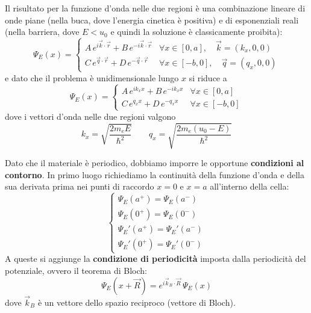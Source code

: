 \begin{example}
Il risultato per la funzione d'onda nelle due regioni è una combinazione lineare di onde piane (nella buca, dove l'energia cinetica è positiva) e di esponenziali reali (nella barriera, dove \( E < u_0 \) e quindi la soluzione è classicamente proibita):
\begin{equation}
    \Psi_E(x) = \begin{cases}
        A\, e^{i \vec{k} \cdot \vec{r}} + B\, e^{-i \vec{k} \cdot \vec{r}} & \forall x \in [0, a], \quad \vec{k} = (k_x, 0, 0) \\[4pt]
        C\, e^{\vec{q} \cdot \vec{r}} + D\, e^{-\vec{q} \cdot \vec{r}} & \forall x \in [-b, 0], \quad \vec{q} = (q_x, 0, 0)
    \end{cases}
\end{equation}
e dato che il problema è unidimensionale lungo \( x \) si riduce a
\begin{equation}
    \Psi_E(x) = \begin{cases}
        A\, e^{i k_x x} + B\, e^{-i k_x x} & \forall x \in [0, a] \\[4pt]
        C\, e^{q_x x} + D\, e^{-q_x x} & \forall x \in [-b, 0]
    \end{cases}
\end{equation}
dove i vettori d'onda nelle due regioni valgono
\begin{equation}
    k_x = \sqrt{\frac{2 m_e E}{\hbar^2}} \qquad q_x = \sqrt{\frac{2 m_e (u_0 - E)}{\hbar^2}}
\end{equation}

Dato che il materiale è periodico, dobbiamo imporre le opportune \textbf{condizioni al contorno}. In primo luogo richiediamo la continuità della funzione d'onda e della sua derivata prima nei punti di raccordo \( x = 0 \) e \( x = a \) all'interno della cella:
\begin{equation}
    \begin{cases}
        \Psi_E(a^+) = \Psi_E(a^-) \\
        \Psi_E(0^+) = \Psi_E(0^-) \\
        \Psi_E'(a^+) = \Psi_E'(a^-) \\
        \Psi_E'(0^+) = \Psi_E'(0^-)
    \end{cases}
\end{equation}
A queste si aggiunge la \textbf{condizione di periodicità} imposta dalla periodicità del potenziale, ovvero il teorema di Bloch:
\begin{equation}
    \Psi_E(x + \vec{R}) = e^{i \vec{k}_B \cdot \vec{R}}\, \Psi_E(x)
\end{equation}
dove \( \vec{k}_B \) è un vettore dello spazio reciproco (vettore di Bloch).


\end{example}

